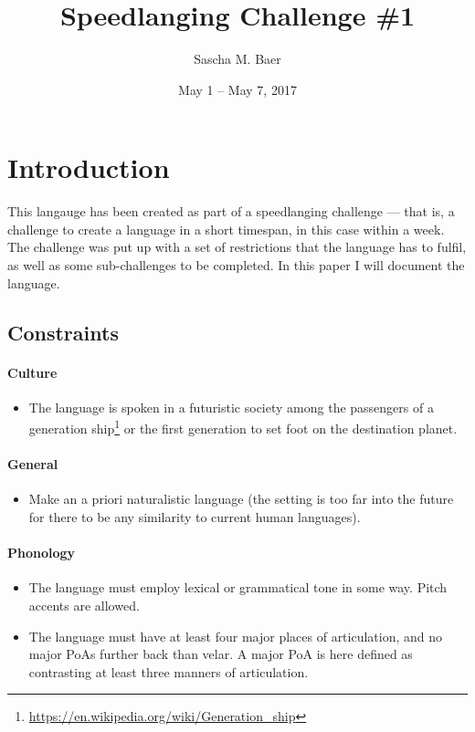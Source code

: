 \documentclass{article}
\title{Speedlanging Challenge \#1\\ \langname{}}
\author{Sascha M. Baer}
\date{May 1 – May 7, 2017}
\begin{document}
\maketitle
\newpage
\tableofcontents
\newpage

\section{Introduction}
This langauge has been created as part of a speedlanging challenge — that is, a challenge to create a language in a short timespan, in this case within a week. The challenge was put up with a set of restrictions that the language has to fulfil, as well as some sub-challenges to be completed. In this paper I will document the language.

\subsection{Constraints}
\paragraph{Culture}
\begin{itemize}
\item The language is spoken in a futuristic society among the passengers of a generation ship\footnote{\url{https://en.wikipedia.org/wiki/Generation\_ship}} or the first generation to set foot on the destination planet.
\end{itemize}

\paragraph{General}
\begin{itemize}
\item Make an a priori naturalistic language (the setting is too far into the future for there to be any similarity to current human languages).
\end{itemize}

\paragraph{Phonology}
\begin{itemize}
\item The language must employ lexical or grammatical tone in some way. Pitch accents are allowed. 
\item The language must have at least four major places of articulation, and no major PoAs further back than velar. A major PoA is here defined as contrasting at least three manners of articulation.
\end{itemize}
\end{document}

